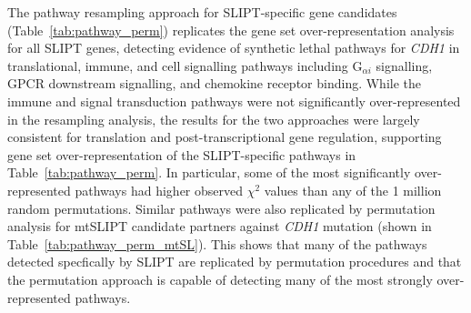 The pathway resampling approach for SLIPT-specific gene candidates (Table~\ref{tab:pathway_perm}) replicates the gene set over-represent\-ation analysis for all SLIPT genes, detecting evidence of synthetic lethal pathways for \textit{CDH1} in translational, immune, and cell signalling pathways including  G$_{\alpha i}$ signalling, GPCR downstream signalling, and chemokine receptor binding. While the immune and signal transduction pathways were not significantly over-represented in the resampling analysis, the results for the two approaches were largely consistent for translation and post-transcriptional gene regulation, supporting gene set over-represent\-ation of the SLIPT-specific pathways in Table~\ref{tab:pathway_perm}. In particular, some of the most significantly over-represented pathways had higher observed $\chi^2$ values than any of the 1 million random permutations. Similar pathways were also replicated by permutation analysis for mtSLIPT candidate partners against \textit{CDH1} mutation (shown in Table~\ref{tab:pathway_perm_mtSL}). This shows that many of the pathways detected specfically by SLIPT are replicated by permutation procedures and that the permutation approach is capable of detecting many of the most strongly over-represented pathways. 


